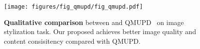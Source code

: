 \begin{figure}[!ht]
\vspace{-8pt}
\centering
\texttt{[image: figures/fig\_qmupd/fig\_qmupd.pdf]}
\vspace{-10pt}
\caption{
    \textbf{Qualitative comparison} between \method and QMUPD~\cite{YiLLR22} on image stylization task.
    Our proposed \method achieves better image quality and content consisitency compared with QMUPD.
}
\label{fig:qmupd}
\end{figure}
